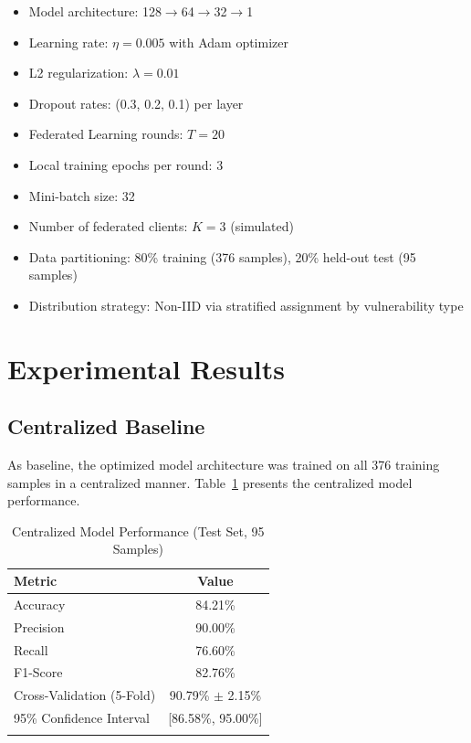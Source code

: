 \documentclass[pdflatex,sn-mathphys-num]{sn-jnl}
\theoremstyle{thmstyleone}%
\theoremstyle{thmstyletwo}%
\theoremstyle{thmstylethree}%
\begin{document}
\begin{itemize}
    \item Model architecture: 128$\rightarrow$64$\rightarrow$32$\rightarrow$1
    \item Learning rate: $\eta = 0.005$ with Adam optimizer
    \item L2 regularization: $\lambda = 0.01$
    \item Dropout rates: (0.3, 0.2, 0.1) per layer
    \item Federated Learning rounds: $T = 20$
    \item Local training epochs per round: 3
    \item Mini-batch size: 32
    \item Number of federated clients: $K = 3$ (simulated)
    \item Data partitioning: 80\% training (376 samples), 20\% held-out test (95 samples)
    \item Distribution strategy: Non-IID via stratified assignment by vulnerability type
\end{itemize}


\section{Experimental Results}\label{sec:results}

\subsection{Centralized Baseline}\label{subsec:baseline}

As baseline, the optimized model architecture was trained on all 376 training samples in a centralized manner. Table~\ref{tab:centralized} presents the centralized model performance.

\begin{table}[h]
\caption{Centralized Model Performance (Test Set, 95 Samples)}\label{tab:centralized}
\begin{tabular}{lc}
\toprule
\textbf{Metric} & \textbf{Value} \\ 
\midrule
Accuracy & 84.21\% \\
Precision & 90.00\% \\
Recall & 76.60\% \\
F1-Score & 82.76\% \\
\midrule
Cross-Validation (5-Fold) & 90.79\% $\pm$ 2.15\% \\
95\% Confidence Interval & [86.58\%, 95.00\%] \\
\botrule
\end{tabular}
\end{table}
\end{document}
